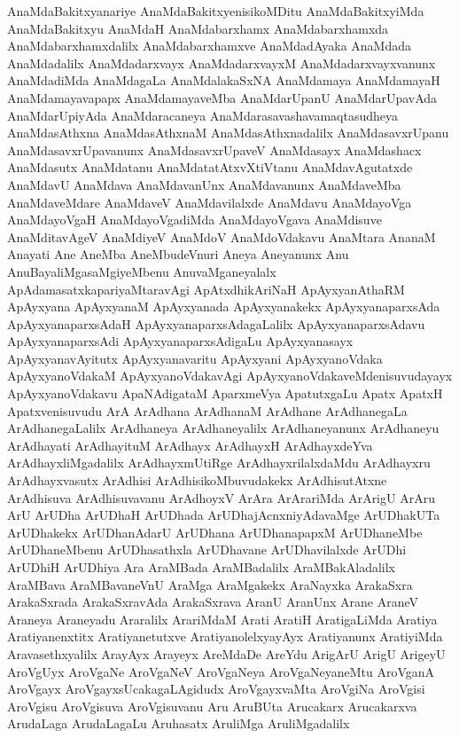 {AnaMdaBakitxyanariye
AnaMdaBakitxyenisikoMDitu
AnaMdaBakitxyiMda
AnaMdaBakitxyu
AnaMdaH
AnaMdabarxhamx
AnaMdabarxhamxda
AnaMdabarxhamxdalilx
AnaMdabarxhamxve
AnaMdadAyaka
AnaMdada
AnaMdadalilx
AnaMdadarxvayx
AnaMdadarxvayxM
AnaMdadarxvayxvanunx
AnaMdadiMda
AnaMdagaLa
AnaMdalakaSxNA
AnaMdamaya
AnaMdamayaH
AnaMdamayavapapx
AnaMdamayaveMba
AnaMdarUpanU
AnaMdarUpavAda
AnaMdarUpiyAda
AnaMdaracaneya
AnaMdarasavashavamaqtasudheya
AnaMdasAthxna
AnaMdasAthxnaM
AnaMdasAthxnadalilx
AnaMdasavxrUpanu
AnaMdasavxrUpavanunx
AnaMdasavxrUpaveV
AnaMdasayx
AnaMdashacx
AnaMdasutx
AnaMdatanu
AnaMdatatAtxvXtiVtanu
AnaMdavAgutatxde
AnaMdavU
AnaMdava
AnaMdavanUnx
AnaMdavanunx
AnaMdaveMba
AnaMdaveMdare
AnaMdaveV
AnaMdavilalxde
AnaMdavu
AnaMdayoVga
AnaMdayoVgaH
AnaMdayoVgadiMda
AnaMdayoVgava
AnaMdisuve
AnaMditavAgeV
AnaMdiyeV
AnaMdoV
AnaMdoVdakavu
AnaMtara
AnanaM
Anayati
Ane
AneMba
AneMbudeVnuri
Aneya
Aneyanunx
Anu
AnuBayaliMgasaMgiyeMbenu
AnuvaMganeyalalx
ApAdamasatxkapariyaMtaravAgi
ApAtxdhikAriNaH
ApAyxyanAthaRM
ApAyxyana
ApAyxyanaM
ApAyxyanada
ApAyxyanakekx
ApAyxyanaparxsAda
ApAyxyanaparxsAdaH
ApAyxyanaparxsAdagaLalilx
ApAyxyanaparxsAdavu
ApAyxyanaparxsAdi
ApAyxyanaparxsAdigaLu
ApAyxyanasayx
ApAyxyanavAyitutx
ApAyxyanavaritu
ApAyxyani
ApAyxyanoVdaka
ApAyxyanoVdakaM
ApAyxyanoVdakavAgi
ApAyxyanoVdakaveMdenisuvudayayx
ApAyxyanoVdakavu
ApaNAdigataM
AparxmeVya
ApatutxgaLu
Apatx
ApatxH
Apatxvenisuvudu
ArA
ArAdhana
ArAdhanaM
ArAdhane
ArAdhanegaLa
ArAdhanegaLalilx
ArAdhaneya
ArAdhaneyalilx
ArAdhaneyanunx
ArAdhaneyu
ArAdhayati
ArAdhayituM
ArAdhayx
ArAdhayxH
ArAdhayxdeYva
ArAdhayxliMgadalilx
ArAdhayxmUtiRge
ArAdhayxrilalxdaMdu
ArAdhayxru
ArAdhayxvasutx
ArAdhisi
ArAdhisikoMbuvudakekx
ArAdhisutAtxne
ArAdhisuva
ArAdhisuvavanu
ArAdhoyxV
ArAra
ArArariMda
ArArigU
ArAru
ArU
ArUDha
ArUDhaH
ArUDhada
ArUDhajAcnxniyAdavaMge
ArUDhakUTa
ArUDhakekx
ArUDhanAdarU
ArUDhana
ArUDhanapapxM
ArUDhaneMbe
ArUDhaneMbenu
ArUDhasathxla
ArUDhavane
ArUDhavilalxde
ArUDhi
ArUDhiH
ArUDhiya
Ara
AraMBada
AraMBadalilx
AraMBakAladalilx
AraMBava
AraMBavaneVnU
AraMga
AraMgakekx
AraNayxka
ArakaSxra
ArakaSxrada
ArakaSxravAda
ArakaSxrava
AranU
AranUnx
Arane
AraneV
Araneya
Araneyadu
Araralilx
ArariMdaM
Arati
AratiH
AratigaLiMda
Aratiya
Aratiyanenxtitx
Aratiyanetutxve
AratiyanolelxyayAyx
Aratiyanunx
AratiyiMda
Aravasethxyalilx
ArayAyx
Arayeyx
AreMdaDe
AreYdu
ArigArU
ArigU
ArigeyU
AroVgUyx
AroVgaNe
AroVgaNeV
AroVgaNeya
AroVgaNeyaneMtu
AroVganA
AroVgayx
AroVgayxsUcakagaLAgidudx
AroVgayxvaMta
AroVgiNa
AroVgisi
AroVgisu
AroVgisuva
AroVgisuvanu
Aru
AruBUta
Arucakarx
Arucakarxva
ArudaLaga
ArudaLagaLu
Aruhasatx
AruliMga
AruliMgadalilx
}
